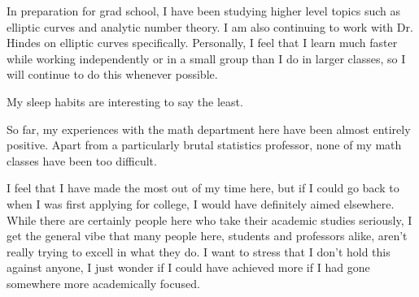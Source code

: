 \documentclass[12pt]{article}
\begin{document}
\pagestyle{fancy}
\fancyhead{}

\normalsize

\noindent
In preparation for grad school, I have been studying higher level topics such as elliptic curves and analytic number theory. I am also continuing to work with Dr. Hindes on elliptic curves specifically. Personally, I feel that I learn much faster while working independently or in a small group than I do in larger classes, so I will continue to do this whenever possible.

\noindent
My sleep habits are interesting to say the least.

\noindent
So far, my experiences with the math department here have been almost entirely positive. Apart from a particularly brutal statistics professor, none of my math classes have been too difficult.

\noindent
I feel that I have made the most out of my time here, but if I could go back to when I was first applying for college, I would have definitely aimed elsewhere. While there are certainly people here who take their academic studies seriously, I get the general vibe that many people here, students and professors alike, aren't really trying to excell in what they do. I want to stress that I don't hold this against anyone, I just wonder if I could have achieved more if I had gone somewhere more academically focused.
\end{document}
